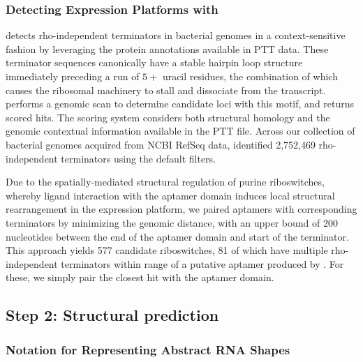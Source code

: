 \subsubsection{Detecting Expression Platforms with \tthp}
\label{subsubsec:rfinder:tthp}

\tthp detects rho-independent terminators in bacterial genomes in a context-sensitive fashion by leveraging the protein annotations available in PTT data. These terminator sequences canonically have a stable hairpin loop structure immediately preceding a run of $5+$ uracil residues, the combination of which causes the ribosomal machinery to stall and dissociate from the transcript. \tthp performs a genomic scan to determine candidate loci with this motif, and returns scored hits. The scoring system considers both structural homology and the genomic contextual information available in the PTT file. Across our collection of bacterial genomes acquired from NCBI RefSeq data, \tthp identified 2,752,469 rho-independent terminators using the default filters.

Due to the spatially-mediated structural regulation of purine riboswitches, whereby ligand interaction with the aptamer domain induces local structural rearrangement in the expression platform, we paired aptamers with corresponding terminators by minimizing the genomic distance, with an upper bound of 200 nucleotides between the end of the aptamer domain and start of the terminator. This approach yields 577 candidate riboswitches, 81 of which have multiple rho-independent terminators within range of a putative aptamer produced by \infernal. For these, we simply pair the closest \tthp hit with the aptamer domain.


\subsection{Step 2: Structural prediction}
\label{subsec:rfinder:strpred}

\subsubsection{Notation for Representing Abstract RNA Shapes}
\label{subsubsec:rfinder:shapes}


